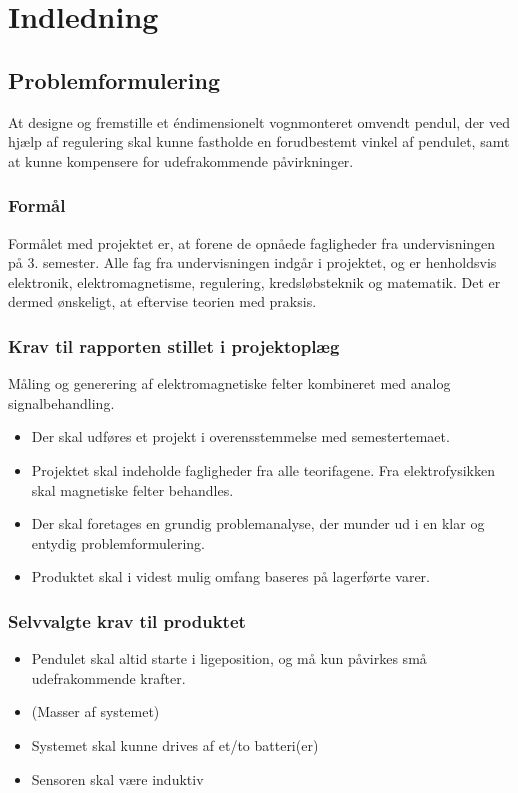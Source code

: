 \chapter{Indledning}

\section{Problemformulering}
At designe og fremstille et éndimensionelt vognmonteret omvendt pendul, der ved hjælp af regulering skal kunne fastholde en forudbestemt vinkel af pendulet, samt at kunne kompensere for udefrakommende påvirkninger. 

\subsection{Formål}
Formålet med projektet er, at forene de opnåede fagligheder fra undervisningen på 3. semester. 
Alle fag fra undervisningen indgår i projektet, og er henholdsvis elektronik, elektromagnetisme, regulering, kredsløbsteknik og matematik.
Det er dermed ønskeligt, at eftervise teorien med praksis. 


\subsection{Krav til rapporten stillet i projektoplæg}
Måling og generering af elektromagnetiske felter kombineret med analog signalbehandling.
\begin{itemize}
\item Der skal udføres et projekt i overensstemmelse med semestertemaet.
\item Projektet skal indeholde fagligheder fra alle teorifagene. Fra elektrofysikken skal
magnetiske felter behandles.
\item Der skal foretages en grundig problemanalyse, der munder ud i en klar og entydig
problemformulering.
\item Produktet skal i videst mulig omfang baseres på lagerførte varer.
\end{itemize}

\subsection{Selvvalgte krav til produktet} \label{afs:kravspecifikation}
\begin{itemize}
\item Pendulet skal altid starte i ligeposition, og må kun påvirkes små udefrakommende krafter.
\item (Masser af systemet)
\item Systemet skal kunne drives af et/to batteri(er)
\item Sensoren skal være induktiv
\end{itemize}


